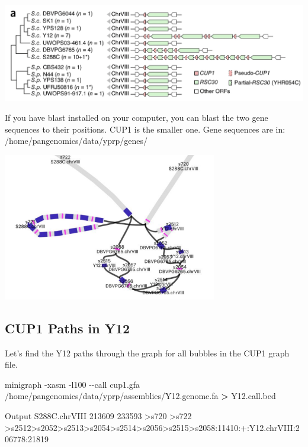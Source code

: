 \documentclass[
]{book}
\newenvironment{Shaded}{\begin{snugshade}}{\end{snugshade}}
\newcommand{\AttributeTok}[1]{\textcolor[rgb]{0.77,0.63,0.00}{#1}}
\newcommand{\ExtensionTok}[1]{#1}
\newcommand{\NormalTok}[1]{#1}
\newcommand{\OperatorTok}[1]{\textcolor[rgb]{0.81,0.36,0.00}{\textbf{#1}}}
\begin{document}
\includegraphics[width=1\textwidth,height=\textheight]{./Figures/StructuralRearrangements.png}

If you have blast installed on your computer, you can blast the two gene sequences to their positions. CUP1 is the smaller one. Gene sequences are in: /home/pangenomics/data/yprp/genes/

\includegraphics[width=0.7\textwidth,height=\textheight]{./Figures/Bandage5.png}

\hypertarget{cup1-paths-in-y12}{%
\subsection*{CUP1 Paths in Y12}\label{cup1-paths-in-y12}}

Let's find the Y12 paths through the graph for all bubbles in the CUP1 graph file.

\begin{Shaded}
\begin{Highlighting}[]
\ExtensionTok{minigraph} \AttributeTok{{-}xasm} \AttributeTok{{-}l100} \AttributeTok{{-}{-}call}\NormalTok{ cup1.gfa /home/pangenomics/data/yprp/assemblies/Y12.genome.fa }\OperatorTok{\textgreater{}}\NormalTok{ Y12.call.bed}
\end{Highlighting}
\end{Shaded}

Output
S288C.chrVIII 213609 233593 \textgreater s720 \textgreater s722 \textgreater s2512\textgreater s2052\textgreater s2513\textgreater s2054\textgreater s2514\textgreater s2056\textgreater s2515\textgreater s2058:11410:+:Y12.chrVIII:206778:21819
\end{document}
